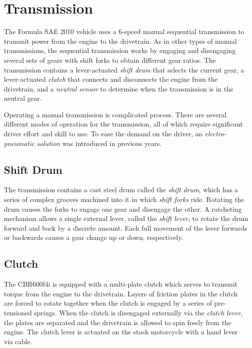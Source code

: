 \section{Transmission\label{sec:background_transmission}}

The Formula SAE 2010 vehicle uses a 6-speed manual sequential transmission to transmit power from the engine to the drivetrain. As in other types of manual transmissions, the sequential transmission works by engaging and disengaging several sets of gears with shift forks to obtain different gear ratios. The transmission contains a lever-actuated \emph{shift drum} that selects the current gear, a lever-actuated \emph{clutch} that connects and disconnects the engine from the drivetrain, and a \emph{neutral sensor} to determine when the transmission is in the neutral gear. 

Operating a manual transmission is complicated process. There are several different modes of operation for the transmission, all of which require significant driver effort and skill to use. To ease the demand on the driver, an \emph{electro-pneumatic solution} was introduced in previous years.

\subsection{Shift Drum}

The transmission contains a cast steel drum called the \emph{shift drum}, which has a series of complex grooves machined into it in which \emph{shift forks} ride. Rotating the drum causes the forks to engage one gear and disengage the other. A ratcheting mechanism allows a single external lever, called the \emph{shift lever}, to rotate the drum forward and back by a discrete amount. Each full movement of the lever forwards or backwards causes a gear change up or down, respectively. 

\subsection{Clutch}

The CBR600f4i is equipped with a multi-plate clutch which serves to transmit torque from the engine to the drivetrain. Layers of friction plates in the clutch are forced to rotate together when the clutch is engaged by a series of pre-tensioned springs. When the clutch is disengaged externally via the \emph{clutch lever}, the plates are separated and the drivetrain is allowed to spin freely from the engine. The clutch lever is actuated on the stock motorcycle with a hand lever via cable.

